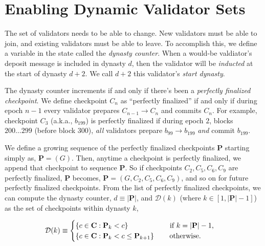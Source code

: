 \documentclass[12pt]{article}
\newcommand{\Genesisblock}{\ensuremath{G}\xspace}
\begin{document}
\section{Enabling Dynamic Validator Sets}
\label{sect:join_and_leave}

The set of validators needs to be able to change.  New validators must be able to join, and existing validators must be able to leave.  To accomplish this, we define a variable in the state called the \textit{dynasty counter}.  When a would-be valdiator's deposit message is included in dynasty $d$, then the validator will be \textit{inducted} at the start of dynasty $d+2$.  We call $d+2$ this validator's \textit{start dynasty}.


The dynasty counter increments if and only if there's been a \emph{perfectly finalized checkpoint}.  We define checkpoint $C_n$ as ``perfectly finalized'' if and only if during epoch $n-1$ every validator prepares $C_{n-1} \to C_{n}$ and commits $C_{n}$.  For example, checkpoint $C_3$ (a.k.a., $b_{199}$) is perfectly finalized if during epoch $2$, blocks $200 \ldots 299$ (before block $300$), \emph{all} validators prepare $b_{99} \to b_{199}$ \emph{and} commit $b_{199}$.

We define a growing sequence of the perfectly finalized checkpoints $\mathbf{P}$ starting simply as, $\mathbf{P} = \left( \Genesisblock \right)$.  Then, anytime a checkpoint is perfectly finalized, we append that checkpoint to sequence $\mathbf{P}$.  So if checkpoints $C_2, C_5, C_6, C_9$ are perfectly finalized, $\mathbf{P}$ becomes, $\mathbf{P} = \left( \Genesisblock, C_2, C_5, C_6, C_9 \right)$, and so on for future perfectly finalized checkpoints.  From the list of perfectly finalized checkpoints, we can compute the dynasty counter, $d \equiv | \mathbf{P} |$, and $\mathcal{D}(k)$ (where $k \in \left[1, |\mathbf{P}| - 1\right]$) as the set of checkpoints within dynasty $k$,
     
\begin{equation}
    \mathcal{D}(k) \equiv \begin{cases}
     \left\{ c \in \mathbf{C} : \mathbf{P}_k < c \right\} \qquad \qquad \qquad \!\! \textnormal{if $k = |\mathbf{P}| - 1$,} \\
         \left\{ c \in \mathbf{C} : \mathbf{P}_k < c \leq \mathbf{P}_{k+1} \right\} \qquad \textnormal{otherwise.} \\
     \end{cases}
\end{equation}
\end{document}
